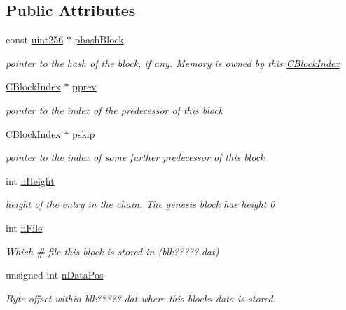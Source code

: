 \subsection*{Public Attributes}
\begin{DoxyCompactItemize}
\item 
const \mbox{\hyperlink{classuint256}{uint256}} $\ast$ \mbox{\hyperlink{class_c_block_index_afac8099e03ffda463c7153ca82d37b66}{phash\+Block}}
\begin{DoxyCompactList}\small\item\em pointer to the hash of the block, if any. Memory is owned by this \mbox{\hyperlink{class_c_block_index}{C\+Block\+Index}} \end{DoxyCompactList}\item 
\mbox{\hyperlink{class_c_block_index}{C\+Block\+Index}} $\ast$ \mbox{\hyperlink{class_c_block_index_a1ef11137155df1dd5c81491630cece39}{pprev}}
\begin{DoxyCompactList}\small\item\em pointer to the index of the predecessor of this block \end{DoxyCompactList}\item 
\mbox{\hyperlink{class_c_block_index}{C\+Block\+Index}} $\ast$ \mbox{\hyperlink{class_c_block_index_ab6242bb77bc01617f5b402d14e6a3883}{pskip}}
\begin{DoxyCompactList}\small\item\em pointer to the index of some further predecessor of this block \end{DoxyCompactList}\item 
int \mbox{\hyperlink{class_c_block_index_aebfc8d6b95852546760e742553d7bfd5}{n\+Height}}
\begin{DoxyCompactList}\small\item\em height of the entry in the chain. The genesis block has height 0 \end{DoxyCompactList}\item 
int \mbox{\hyperlink{class_c_block_index_a3653cb1e1bc3fa3fcdf1ed50ff93b50a}{n\+File}}
\begin{DoxyCompactList}\small\item\em Which \# file this block is stored in (blk?????.dat) \end{DoxyCompactList}\item 
unsigned int \mbox{\hyperlink{class_c_block_index_af164283dfb2d62ac44be8d10446bce4a}{n\+Data\+Pos}}
\begin{DoxyCompactList}\small\item\em Byte offset within blk?????.dat where this block\textquotesingle{}s data is stored. \end{DoxyCompactList}\item 

\end{DoxyCompactItemize}
